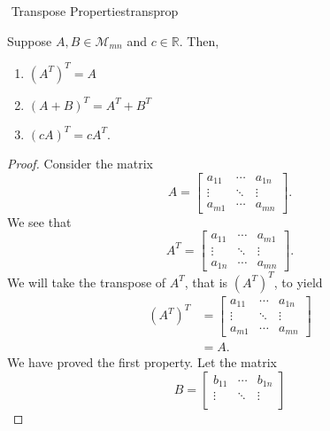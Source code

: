         \begin{theorem}{\Stop\,\,Transpose Properties}{transprop}
        
            Suppose \(A,B\in\mathcal{M}_{mn}\) and \(c\in\mathbb{R}\). Then,
            \begin{enumerate}
                \item \((A^T)^T=A\)
                \item \((A+B)^T=A^T+B^T\)
                \item \((cA)^T=cA^T\).
            \end{enumerate}
            \begin{proof}
                Consider the matrix 
                \begin{equation*}
                    A=\begin{bmatrix} a_{11} & \cdots & a_{1n} \\ \vdots & \ddots & \vdots \\
                    a_{m1} & \cdots & a_{mn} \end{bmatrix}.
                \end{equation*}
                We see that
                \begin{equation*}
                    A^T=\begin{bmatrix} a_{11} & \cdots & a_{m1} \\ \vdots & \ddots & \vdots \\
                    a_{1n} & \cdots & a_{mn} \end{bmatrix}.
                \end{equation*}
                We will take the transpose of \(A^T\), that is \((A^T)^T\), to yield
                \begin{align*}
                    (A^T)^T&=\begin{bmatrix} a_{11} & \cdots & a_{1n} \\ \vdots & \ddots & \vdots \\
                    a_{m1} & \cdots & a_{mn} \end{bmatrix} \\
                    &=A.
                \end{align*}
                We have proved the first property. Let the matrix
                \begin{equation*}
                    B=\begin{bmatrix} b_{11} & \cdots & b_{1n} \\ \vdots & \ddots & \vdots \\

\end{bmatrix}
\end{equation*}
\end{proof}
\end{theorem}
